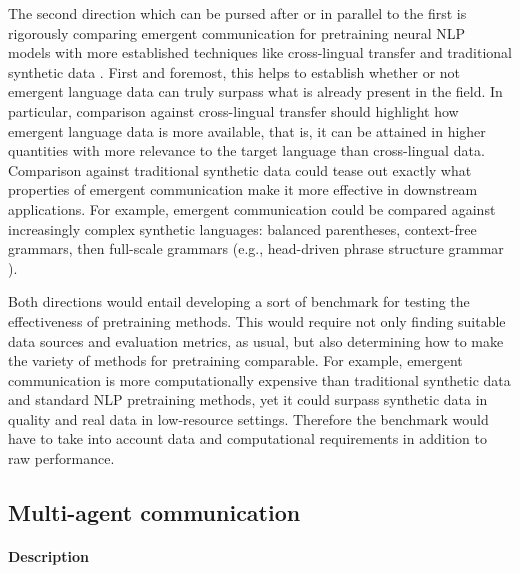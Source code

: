 The second direction which can be pursed after or in parallel to the first is rigorously comparing emergent communication for pretraining neural NLP models with more established techniques like cross-lingual transfer and traditional synthetic data \citep{artetxe-etal-2020-cross}.
First and foremost, this helps to establish whether or not emergent language data can truly surpass what is already present in the field.
In particular, comparison against cross-lingual transfer should highlight how emergent language data is more available, that is, it can be attained in higher quantities with more relevance to the target language than cross-lingual data.
Comparison against traditional synthetic data could tease out exactly what properties of emergent communication make it more effective in downstream applications.
For example, emergent communication could be compared against increasingly complex synthetic languages: balanced parentheses, context-free grammars, then full-scale grammars (e.g., head-driven phrase structure grammar \citep{pollard1994head}).

Both directions would entail developing a sort of benchmark for testing the effectiveness of pretraining methods.
This would require not only finding suitable data sources and evaluation metrics, as usual, but also determining how to make the variety of methods for pretraining comparable.
For example, emergent communication is more computationally expensive than traditional synthetic data and standard NLP pretraining methods, yet it could surpass synthetic data in quality and real data in low-resource settings.
Therefore the benchmark would have to take into account data and computational requirements in addition to raw performance.


\subsection{Multi-agent communication}%
\label{sec:rev-multi-agent}
\paragraph{Description}

